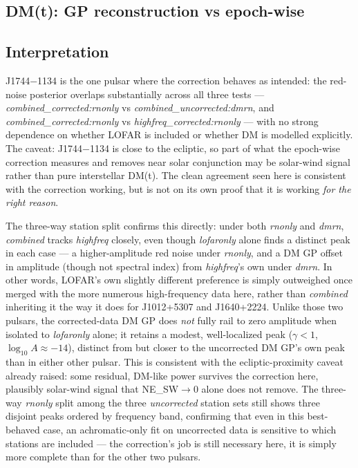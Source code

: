 \subsection{DM(t): GP reconstruction vs epoch-wise}

\subsection{Interpretation}

J1744$-$1134 is the one pulsar where the correction behaves as intended: the
red-noise posterior overlaps substantially across all three tests ---
\emph{combined\_corrected:rnonly} vs \emph{combined\_uncorrected:dmrn},
and \emph{combined\_corrected:rnonly} vs \emph{highfreq\_corrected:rnonly}
--- with no strong dependence on whether LOFAR is included or whether DM is
modelled explicitly. The caveat: J1744$-$1134 is close to the ecliptic, so
part of what the epoch-wise correction measures and removes near solar
conjunction may be solar-wind signal rather than pure interstellar DM(t).
The clean agreement seen here is consistent with the correction working,
but is not on its own proof that it is working \emph{for the right reason}.

The three-way station split confirms this directly: under both
\emph{rnonly} and \emph{dmrn}, \emph{combined} tracks \emph{highfreq}
closely, even though \emph{lofaronly} alone finds a distinct peak in each
case --- a higher-amplitude red noise under \emph{rnonly}, and a DM GP
offset in amplitude (though not spectral index) from \emph{highfreq}'s own
under \emph{dmrn}. In other words, LOFAR's own slightly different
preference is simply outweighed once merged with the more numerous
high-frequency data here, rather than \emph{combined} inheriting it the way
it does for J1012+5307 and J1640+2224. Unlike those two pulsars, the
corrected-data DM GP does \emph{not} fully rail to zero amplitude when
isolated to \emph{lofaronly} alone; it retains a modest, well-localized
peak ($\gamma<1$, $\log_{10}A\approx-14$), distinct from but closer to the
uncorrected DM GP's own peak than in either other pulsar. This is
consistent with the ecliptic-proximity caveat already raised: some
residual, DM-like power survives the correction here, plausibly solar-wind
signal that NE\_SW$\to$0 alone does not remove. The three-way \emph{rnonly}
split among the three \emph{uncorrected} station sets still shows three
disjoint peaks ordered by frequency band, confirming that even in this
best-behaved case, an achromatic-only fit on uncorrected data is sensitive
to which stations are included --- the correction's job is still necessary
here, it is simply more complete than for the other two pulsars.
